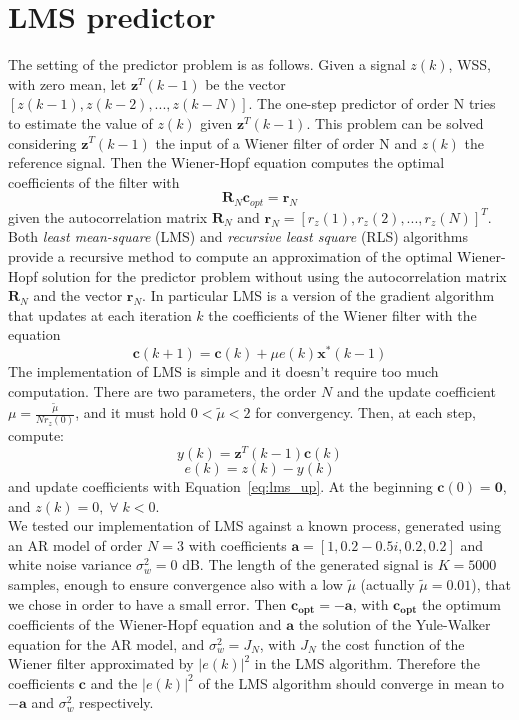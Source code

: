\documentclass[10pt]{article}
\numberwithin{equation}{section}
\begin{document}
\section{LMS predictor}
\label{sec:lms}
The setting of the predictor problem is as follows. Given a signal $z(k)$, WSS, with zero mean, let $\mathbf{z}^T(k-1)$ be the vector $[z(k-1), z(k-2), ..., z(k-N)]$. The one-step predictor of order N tries to estimate the value of $z(k)$ given $\mathbf{z}^T(k-1)$. This problem can be solved considering $\mathbf{z}^T(k-1)$ the input of a Wiener filter of order N and $z(k)$ the reference signal. Then the Wiener-Hopf equation computes the optimal coefficients of the filter with
\begin{equation}
  \mathbf{R}_N \mathbf{c}_{opt} = \mathbf{r}_N
  \label{eq:wh}
\end{equation}
given the autocorrelation matrix $\mathbf{R}_N$ and $\mathbf{r}_N = [r_z(1), r_z(2), ..., r_z(N)]^T$. \\
Both \textit{least mean-square} (LMS) and \textit{recursive least square} (RLS) algorithms provide a recursive method to compute an approximation of the optimal Wiener-Hopf solution for the predictor problem without using the autocorrelation matrix $\mathbf{R}_N$ and the vector $\mathbf{r}_N$.
In particular LMS is a version of the gradient algorithm that updates at each iteration $k$ the coefficients of the Wiener filter with the equation
\begin{equation}
  \mathbf{c}(k+1) = \mathbf{c}(k) + \mu e(k) \mathbf{x}^*(k-1)
  \label{eq:lms_up}
\end{equation}
The implementation of LMS is simple and it doesn't require too much computation. There are two parameters, the order $N$ and the update coefficient $\mu = \frac{\tilde{\mu}}{N r_z(0)}$, and it must hold $0 < \tilde{\mu} < 2$ for convergency. Then, at each step, compute:
\begin{equation}
  y(k) = \mathbf{z}^T(k-1) \mathbf{c}(k)
\end{equation}
\begin{equation}
  e(k) = z(k) - y(k)
\end{equation}
and update coefficients with Equation~\ref{eq:lms_up}. At the beginning $\mathbf{c}(0) = \mathbf{0}$, and $z(k) = 0, \; \forall \; k < 0$. \\
We tested our implementation of LMS against a known process, generated using an AR model of order $N = 3$ with coefficients $\mathbf{a} = [1, 0.2-0.5i, 0.2, 0.2]$ and white noise variance $\sigma_w^2 = 0$ dB. The length of the generated signal is $K = 5000$ samples, enough to ensure convergence also with a low $\tilde{\mu}$ (actually $\tilde{\mu} = 0.01$), that we chose in order to have a small error. Then $\mathbf{c_{opt}} = -\mathbf{a}$, with $\mathbf{c_{opt}}$ the optimum coefficients  of the Wiener-Hopf equation and $\mathbf{a}$ the solution of the Yule-Walker equation for the AR model, and $\sigma_w^2 = J_N$, with $J_N$ the cost function of the Wiener filter approximated by $|e(k)|^2$ in the LMS algorithm. Therefore the coefficients $\mathbf{c}$ and the $|e(k)|^2$ of the LMS algorithm should converge in mean to $-\mathbf{a}$ and $\sigma_w^2$ respectively.
\end{document}
